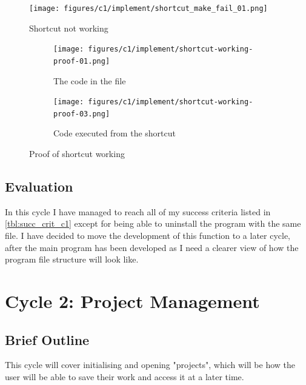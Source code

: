 \documentclass[11pt]{article}
\begin{document}
            \begin{figure}[!h]
                \centering
                \texttt{[image: figures/c1/implement/shortcut\_make\_fail\_01.png]}
                \caption{Shortcut not working}
                \label{fig:shortcut-fail-c1}
            \end{figure}

            \begin{figure}[!h]
                \centering
                \begin{subfigure}{.4\textwidth}
                    \centering
                    \texttt{[image: figures/c1/implement/shortcut-working-proof-01.png]}
                    \caption{The code in the file}
                    \label{fig:sc-working-proof-1-c1}
                \end{subfigure}%
                \begin{subfigure}{.4\textwidth}
                    \centering
                    \texttt{[image: figures/c1/implement/shortcut-working-proof-03.png]}
                    \caption{Code executed from the shortcut}
                    \label{fig:}
                \end{subfigure}%
                \caption{Proof of shortcut working}
            \end{figure}



        \subsection{Evaluation}
            In this cycle I have managed to reach all of my success criteria listed in \autoref{tbl:succ_crit_c1} except for being able to uninstall the program with the same file. I have decided to move the development of this function to a later cycle, after the main program has been developed as I need a clearer view of how the program file structure will look like. 

    \newpage
    \section{Cycle 2: Project Management}
        \subsection{Brief Outline}
            This cycle will cover initialising and opening "projects", which will be how the user will be able to save their work and access it at a later time. 
            
\end{document}
